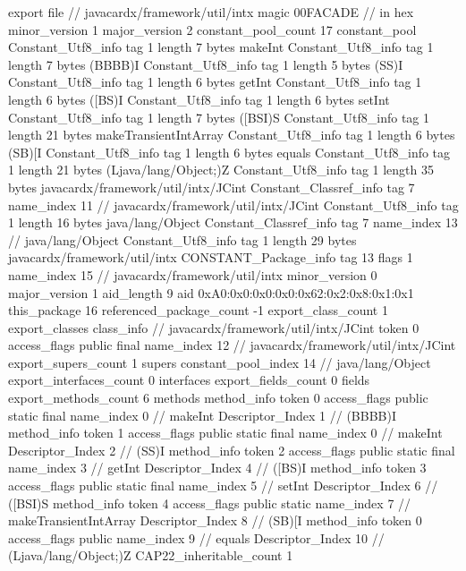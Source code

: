 export file {		// javacardx/framework/util/intx
	magic	00FACADE		 // in hex
	minor_version	1
	major_version	2
	constant_pool_count	17
	constant_pool {
		Constant_Utf8_info {
			tag	1
			length	7
			bytes	makeInt
		}
		Constant_Utf8_info {
			tag	1
			length	7
			bytes	(BBBB)I
		}
		Constant_Utf8_info {
			tag	1
			length	5
			bytes	(SS)I
		}
		Constant_Utf8_info {
			tag	1
			length	6
			bytes	getInt
		}
		Constant_Utf8_info {
			tag	1
			length	6
			bytes	([BS)I
		}
		Constant_Utf8_info {
			tag	1
			length	6
			bytes	setInt
		}
		Constant_Utf8_info {
			tag	1
			length	7
			bytes	([BSI)S
		}
		Constant_Utf8_info {
			tag	1
			length	21
			bytes	makeTransientIntArray
		}
		Constant_Utf8_info {
			tag	1
			length	6
			bytes	(SB)[I
		}
		Constant_Utf8_info {
			tag	1
			length	6
			bytes	equals
		}
		Constant_Utf8_info {
			tag	1
			length	21
			bytes	(Ljava/lang/Object;)Z
		}
		Constant_Utf8_info {
			tag	1
			length	35
			bytes	javacardx/framework/util/intx/JCint
		}
		Constant_Classref_info {
			tag	7
			name_index	11		// javacardx/framework/util/intx/JCint
		}
		Constant_Utf8_info {
			tag	1
			length	16
			bytes	java/lang/Object
		}
		Constant_Classref_info {
			tag	7
			name_index	13		// java/lang/Object
		}
		Constant_Utf8_info {
			tag	1
			length	29
			bytes	javacardx/framework/util/intx
		}
		CONSTANT_Package_info {
			tag	13
			flags	1
			name_index	15		// javacardx/framework/util/intx
			minor_version	0
			major_version	1
			aid_length	9
			aid	0xA0:0x0:0x0:0x0:0x62:0x2:0x8:0x1:0x1
		}
	}
	this_package	16
	referenced_package_count	-1
	export_class_count	1
	export_classes {
		class_info {		// javacardx/framework/util/intx/JCint
			token	0
			access_flags	public final
			name_index	12		// javacardx/framework/util/intx/JCint
			export_supers_count	1
			supers {
				constant_pool_index	14		// java/lang/Object
			}
			export_interfaces_count	0
			interfaces {
			}
			export_fields_count	0
			fields {
			}
			export_methods_count	6
			methods {
				method_info {
					token	0
					access_flags	public static final
					name_index	0		// makeInt
					Descriptor_Index	1		// (BBBB)I
				}
				method_info {
					token	1
					access_flags	public static final
					name_index	0		// makeInt
					Descriptor_Index	2		// (SS)I
				}
				method_info {
					token	2
					access_flags	public static final
					name_index	3		// getInt
					Descriptor_Index	4		// ([BS)I
				}
				method_info {
					token	3
					access_flags	public static final
					name_index	5		// setInt
					Descriptor_Index	6		// ([BSI)S
				}
				method_info {
					token	4
					access_flags	public static
					name_index	7		// makeTransientIntArray
					Descriptor_Index	8		// (SB)[I
				}
				method_info {
					token	0
					access_flags	public
					name_index	9		// equals
					Descriptor_Index	10		// (Ljava/lang/Object;)Z
				}
			}
			CAP22_inheritable_count	1
		}
	}
}
